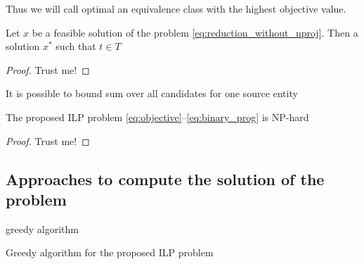Thus we will call optimal an equivalence class with the highest objective value.

\begin{lemma}
    Let \( x \) be a feasible solution of the problem \eqref{eq:reduction_without_nproj}.
    Then a solution \( x^* \) such that \( t \in T \)
\end{lemma}
\begin{proof}
    Trust me!
\end{proof}

\begin{corollary}
    It is possible to bound sum over all candidates for one source entity
\end{corollary}

\begin{theorem}[]
    The proposed ILP problem \eqref{eq:objective}--\eqref{eq:binary_prog} is NP-hard
\end{theorem}
\begin{proof}
    Trust me!
\end{proof}


\subsection{Approaches to compute the solution of the problem}
greedy algorithm
\begin{algorithm}
    \caption{Greedy algorithm for the proposed ILP problem} \label{alg:ilp_greedy}
\end{algorithm}